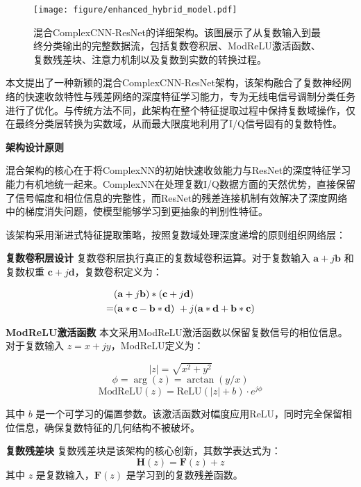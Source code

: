 \documentclass[conference]{IEEEtran}
\begin{document}
\begin{figure}[htbp]
\centering
\texttt{[image: figure/enhanced\_hybrid\_model.pdf]}
\caption{混合ComplexCNN-ResNet的详细架构。该图展示了从复数输入到最终分类输出的完整数据流，包括复数卷积层、ModReLU激活函数、复数残差块、注意力机制以及复数到实数的转换过程。}
\label{fig:enhanced_hybrid_model}
\end{figure}

本文提出了一种新颖的混合ComplexCNN-ResNet架构，该架构融合了复数神经网络的快速收敛特性与残差网络的深度特征学习能力，专为无线电信号调制分类任务进行了优化。与传统方法不同，此架构在整个特征提取过程中保持复数域操作，仅在最终分类层转换为实数域，从而最大限度地利用了I/Q信号固有的复数特性。

\textbf{架构设计原则}

混合架构的核心在于将ComplexNN的初始快速收敛能力与ResNet的深度特征学习能力有机地统一起来。ComplexNN在处理复数I/Q数据方面的天然优势，直接保留了信号幅度和相位信息的完整性，而ResNet的残差连接机制有效解决了深度网络中的梯度消失问题，使模型能够学习到更抽象的判别性特征。

该架构采用渐进式特征提取策略，按照复数域处理深度递增的原则组织网络层：

\textbf{复数卷积层设计} 复数卷积层执行真正的复数域卷积运算。对于复数输入 $\mathbf{a} + j\mathbf{b}$ 和复数权重 $\mathbf{c} + j\mathbf{d}$，复数卷积定义为：

\begin{align}
&(\mathbf{a} + j\mathbf{b}) * (\mathbf{c} + j\mathbf{d}) \notag \\
= &(\mathbf{a} * \mathbf{c} - \mathbf{b} * \mathbf{d}) 
+ j(\mathbf{a} * \mathbf{d} + \mathbf{b} * \mathbf{c})
\end{align}

\textbf{ModReLU激活函数} 本文采用ModReLU激活函数以保留复数信号的相位信息。对于复数输入 $z = x + jy$，ModReLU定义为：

\begin{equation}
|z| = \sqrt{x^2 + y^2}
\end{equation}
\begin{equation}
\phi = \arg(z) = \arctan(y/x)
\end{equation}
\begin{equation}
\text{ModReLU}(z) = \text{ReLU}(|z| + b) \cdot e^{j\phi}
\end{equation}

其中 $b$ 是一个可学习的偏置参数。该激活函数对幅度应用ReLU，同时完全保留相位信息，确保复数特征的几何结构不被破坏。

\textbf{复数残差块} 复数残差块是该架构的核心创新，其数学表达式为：
\begin{equation}
\mathbf{H}(z) = \mathbf{F}(z) + z
\end{equation}
其中 $z$ 是复数输入，$\mathbf{F}(z)$ 是学习到的复数残差函数。
\end{document}
